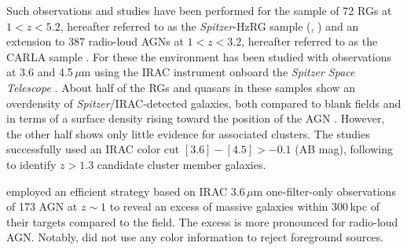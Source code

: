 \documentclass[mathleft,fleqn,%
]{an}
\begin{document}
Such observations and studies have been performed 
for the sample of 72 RGs at $1<z<5.2$, hereafter referred to as the
{\it Spitzer}-HzRG 
sample (\citealt{Seymour07}, \citealt{Galametz12}) and an
extension to 387 radio-loud AGNs at $1<z<3.2$, hereafter referred to as the CARLA
sample \citep{Wylezalek13}.
For these  
the environment has been studied with observations at 3.6
and 4.5\,$\mu$m using the IRAC instrument 
\citep{Fazio04} onboard 
the {\it Spitzer Space Telescope} \citep{Werner04}.
About half of the RGs and quasars in these samples show an overdensity of 
{\it Spitzer}/IRAC-detected galaxies, both compared to blank fields
and in terms of a 
surface density rising toward the position of the AGN 
\citep{Galametz12, Wylezalek13, Hatch14}. 
However, the other half shows only little evidence for associated clusters.
The studies successfully used an IRAC color cut 
$[3.6] - [4.5] > -0.1$ (AB mag), following 
\citet{Huang04}
to identify $z>1.3$ candidate cluster member galaxies.

\citet{Falder10} employed an efficient strategy based on
IRAC 3.6\,$\mu$m one-filter-only observations of 173 AGN at $z \sim 1$
to reveal 
an excess of
massive galaxies within 300\,kpc of their targets compared to the
field.  The excess is more pronounced for radio-loud AGN.
Notably, \citet{Falder10} did not use any color 
information to reject foreground sources.
\end{document}
